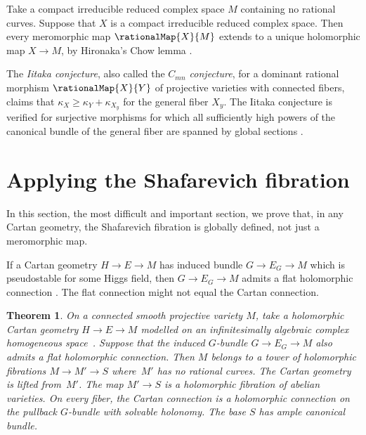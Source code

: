 \documentclass[10pt,a4paper]{amsart}
\numberwithin{equation}{section}
\newtheorem{Theorem}{Theorem}[section]
\begin{document}
Take a compact irreducible reduced complex space $M$ containing no rational curves.
Suppose that $X$ is a compact irreducible reduced complex space. Then every meromorphic map $\rationalMap{X}{M}$ extends to a unique holomorphic map $X \to M$, by Hironaka's Chow lemma \cite[Corollary~2.9]{Grauert:1994}.

The \emph{Iitaka conjecture}, also called the \emph{$C_{mn}$ conjecture}, for a dominant rational morphism $\rationalMap{X}{Y}$ of projective varieties with connected fibers, claims that $\kappa_X \ge \kappa_Y + \kappa_{X_y}$ for the general fiber $X_y$.
The Iitaka conjecture is verified for surjective morphisms for which all sufficiently high powers of the canonical bundle of the general fiber are spanned by global sections \cite[Corollary~1.2]{Kawamata:1985}.

\section{Applying the Shafarevich fibration}
In this section, the most difficult and important section, we prove that, in any Cartan geometry, the Shafarevich fibration is globally defined, not just a meromorphic map.
\begin{Example}
If a Cartan geometry $H \to E \to M$ has induced bundle $G \to E_G
\to M$ which is pseudostable for some Higgs field, then $G \to E_G \to M$ admits a
flat holomorphic connection \cite[Theorem~1.1]{Biswas/Gomez:2008}.
The flat connection might not equal the Cartan connection.
\end{Example}


\begin{Theorem}\label{theorem:JR}
On a connected smooth projective variety $M$, take a holomorphic Cartan geometry $H\to E \to M$ modelled on an infinitesimally algebraic complex homogeneous space~.
Suppose that the induced $G$-bundle $G \to E_G \to M$ also admits a flat holomorphic connection.
Then $M$ belongs to a tower of holomorphic fibrations $M \to M' \to S$ where~$M'$ has no rational curves.
The Cartan geometry is lifted from~$M'$.
The map $M' \to S$ is a holomorphic fibration of abelian varieties.
On every fiber, the Cartan connection is a holomorphic connection on the pullback $G$-bundle with solvable holonomy.
The base $S$ has ample canonical bundle.
\end{Theorem}
\end{document}
